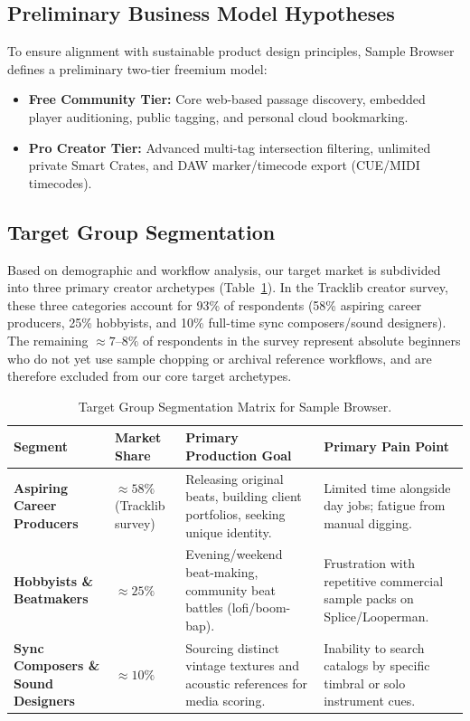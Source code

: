 \subsection*{Preliminary Business Model Hypotheses}
To ensure alignment with sustainable product design principles, Sample Browser defines a preliminary two-tier freemium model:
\begin{itemize}[nosep]
    \item \textbf{Free Community Tier:} Core web-based passage discovery, embedded player auditioning, public tagging, and personal cloud bookmarking.
    \item \textbf{Pro Creator Tier:} Advanced multi-tag intersection filtering, unlimited private Smart Crates, and DAW marker/timecode export (CUE/MIDI timecodes).
\end{itemize}

\subsection*{Target Group Segmentation}

Based on demographic and workflow analysis, our target market is subdivided into three primary creator archetypes (Table~\ref{tbl:target_segments}). In the Tracklib creator survey, these three categories account for 93\% of respondents (58\% aspiring career producers, 25\% hobbyists, and 10\% full-time sync composers/sound designers). The remaining $\approx 7\text{--}8\%$ of respondents in the survey represent absolute beginners who do not yet use sample chopping or archival reference workflows, and are therefore excluded from our core target archetypes.

\begin{table}[h]
    \centering
    \caption{Target Group Segmentation Matrix for Sample Browser.}
    \begin{tabularx}{\textwidth}{|>{\raggedright\arraybackslash}p{3.2cm}|>{\raggedright\arraybackslash}p{2.6cm}|>{\raggedright\arraybackslash}X|>{\raggedright\arraybackslash}X|}
        \hline
        \textbf{Segment} & \textbf{Market Share} & \textbf{Primary Production Goal} & \textbf{Primary Pain Point} \\
        \hline
        \textbf{Aspiring Career Producers} & $\approx 58\%$ (Tracklib survey) & Releasing original beats, building client portfolios, seeking unique identity. & Limited time alongside day jobs; fatigue from manual digging. \\
        \hline
        \textbf{Hobbyists \& Beatmakers} & $\approx 25\%$ & Evening/weekend beat-making, community beat battles (lofi/boom-bap). & Frustration with repetitive commercial sample packs on Splice/Looperman. \\
        \hline
        \textbf{Sync Composers \& Sound Designers} & $\approx 10\%$ & Sourcing distinct vintage textures and acoustic references for media scoring. & Inability to search catalogs by specific timbral or solo instrument cues. \\
        \hline
    \end{tabularx}
    \label{tbl:target_segments}
\end{table}

